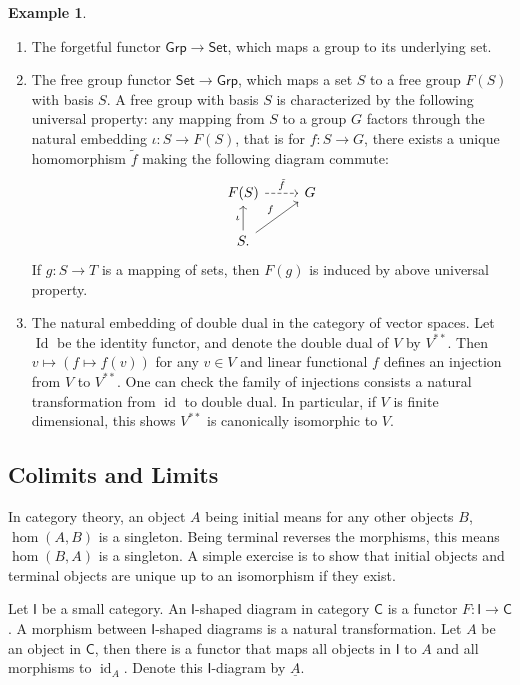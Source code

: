 \documentclass[a4paper]{amsart}
\theoremstyle{plain}
\theoremstyle{definition}
\newtheorem{eg}[thm]{Example}
\theoremstyle{remark}
\begin{document}
\begin{eg}
    \begin{enumerate}
        \item The forgetful functor $\mathsf{Grp}\to\mathsf{Set}$, which maps a group to its underlying set.
        \item The free group functor $\mathsf{Set}\to\mathsf{Grp}$, which maps a set $S$ to a free group $F(S)$ with basis $S$.
        A free group with basis $S$ is characterized by the following universal property:
        any mapping from $S$ to a group $G$ factors through the natural embedding $\iota:S\to F(S)$, that is for $f:S\to G$, there exists a unique homomorphism $\tilde{f}$ making the following diagram commute:
        \[\begin{tikzcd}
            F(S) \ar[r, dashed, "\tilde{f}"] & G \\
            S \ar[u, "\iota"] \ar[ur, "f"].
        \end{tikzcd}\]
        If $g:S\to T$ is a mapping of sets, then $F(g)$ is induced by above universal property.
        \item The natural embedding of double dual in the category of vector spaces.
        Let $\operatorname{Id}$ be the identity functor, and denote the double dual of $V$ by $V^{**}$.
        Then $v\mapsto(f\mapsto f(v))$ for any $v\in V$ and linear functional $f$ defines an injection from $V$ to $V^{**}$.
        One can check the family of injections consists a natural transformation from $\operatorname{id}$ to double dual.
        In particular, if $V$ is finite dimensional, this shows $V^{**}$ is canonically isomorphic to $V$.
    \end{enumerate}
\end{eg}

\subsection{Colimits and Limits}
In category theory, an object $A$ being initial means for any other objects $B$, $\hom(A,B)$ is a singleton.
Being terminal reverses the morphisms, this means $\hom(B,A)$ is a singleton.
A simple exercise is to show that initial objects and terminal objects are unique up to an isomorphism if they exist.

Let $\mathsf{I}$ be a small category.
An $\mathsf{I}$-shaped diagram in category $\mathsf{C}$ is a functor $F:\mathsf{I}\to\mathsf{C}$.
A morphism between $\mathsf{I}$-shaped diagrams is a natural transformation.
Let $A$ be an object in $\mathsf{C}$, then there is a functor that maps all objects in $\mathsf{I}$ to $A$ and all morphisms to $\operatorname{id}_A$.
Denote this $\mathsf{I}$-diagram by $\underline{A}$.
\end{document}
